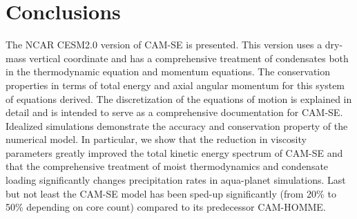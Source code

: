 \documentclass{agujournal}
\begin{document}



\section{Conclusions}\label{sec:concl}
The NCAR CESM2.0 version of CAM-SE is presented. This version uses a dry-mass vertical coordinate and has a comprehensive treatment of condensates both in the thermodynamic equation and momentum equations. The conservation properties in terms of total energy and axial angular momentum for this system of equations derived. The discretization of the equations of motion is explained in detail and is intended to serve as a comprehensive documentation for CAM-SE. Idealized simulations demonstrate the accuracy and conservation property of the numerical model. In particular, we show that the reduction in viscosity parameters greatly improved the total kinetic energy spectrum of CAM-SE and that the comprehensive treatment of moist thermodynamics and condensate loading significantly changes precipitation rates in aqua-planet simulations. Last but not least the CAM-SE model has been sped-up significantly (from 20\% to 50\% depending on core count) compared to its predecessor CAM-HOMME.


\end{document}
